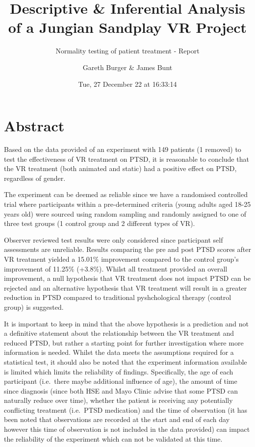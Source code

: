 \documentclass[
  10pt,
]{article}
\title{Descriptive \& Inferential Analysis of a Jungian Sandplay VR
Project}
\subtitle{Normality testing of patient treatment - Report}
\author{Gareth Burger \& James Bunt}
\date{Tue, 27 December 22 at 16:33:14}
\begin{document}
\maketitle

{
\setcounter{tocdepth}{3}
\tableofcontents
}
\hypertarget{abstract}{%
\section{Abstract}\label{abstract}}

Based on the data provided of an experiment with 149 patients (1
removed) to test the effectiveness of VR treatment on PTSD, it is
reasonable to conclude that the VR treatment (both animated and static)
had a positive effect on PTSD, regardless of gender.

The experiment can be deemed as reliable since we have a randomised
controlled trial where participants within a pre-determined criteria
(young adults aged 18-25 years old) were sourced using random sampling
and randomly assigned to one of three test groups (1 control group and 2
different types of VR).

Observer reviewed test results were only considered since participant
self assessments are unreliable. Results comparing the pre and post PTSD
scores after VR treatment yielded a 15.01\% improvement compared to the
control group's improvement of 11.25\% (+3.8\%). Whilst all treatment
provided an overall improvement, a null hypothesis that VR treatment
does not impact PTSD can be rejected and an alternative hypothesis that
VR treatment will result in a greater reduction in PTSD compared to
traditional pyshchological therapy (control group) is suggested.

It is important to keep in mind that the above hypothesis is a
prediction and not a definitive statement about the relationship between
the VR treatment and reduced PTSD, but rather a starting point for
further investigation where more information is needed. Whilst the data
meets the assumptions required for a statistical test, it should also be
noted that the experiment information available is limited which limits
the reliability of findings. Specifically, the age of each participant
(i.e.~there maybe additional influence of age), the amount of time since
diagnosis (since both HSE and Mayo Clinic advise that some PTSD can
naturally reduce over time), whether the patient is receiving any
potentially conflicting treatment (i.e.~PTSD medication) and the time of
observation (it has been noted that observations are recorded at the
start and end of each day however this time of observation is not
included in the data provided) can impact the reliability of the
experiment which can not be validated at this time.
\end{document}
